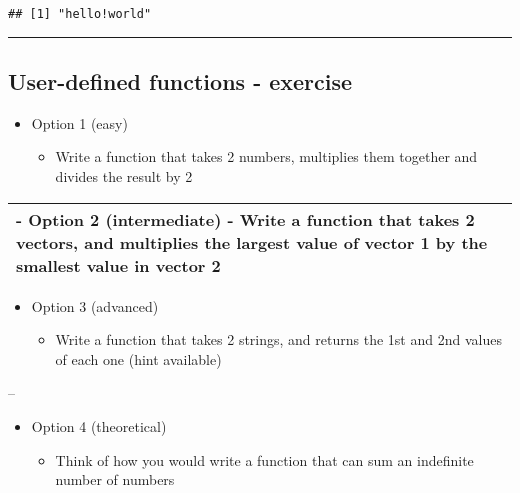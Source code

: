 \documentclass[]{article}
\providecommand{\tightlist}{%
  \setlength{\itemsep}{0pt}\setlength{\parskip}{0pt}}
\begin{document}
\begin{verbatim}
## [1] "hello!world"
\end{verbatim}

\begin{center}\rule{0.5\linewidth}{\linethickness}\end{center}

\hypertarget{user-defined-functions---exercise}{%
\subsection{User-defined functions -
exercise}\label{user-defined-functions---exercise}}

\begin{itemize}
\tightlist
\item
  Option 1 (easy)

  \begin{itemize}
  \tightlist
  \item
    Write a function that takes 2 numbers, multiplies them together and
    divides the result by 2
  \end{itemize}
\end{itemize}

\begin{longtable}[]{@{}l@{}}
\toprule
\endhead
\begin{minipage}[t]{0.04\columnwidth}\raggedright
- Option 2 (intermediate) - Write a function that takes 2 vectors, and
multiplies the largest value of vector 1 by the smallest value in vector
2\strut
\end{minipage}\tabularnewline
\bottomrule
\end{longtable}

\begin{itemize}
\tightlist
\item
  Option 3 (advanced)

  \begin{itemize}
  \tightlist
  \item
    Write a function that takes 2 strings, and returns the 1st and 2nd
    values of each one (hint available)
  \end{itemize}
\end{itemize}

--

\begin{itemize}
\tightlist
\item
  Option 4 (theoretical)

  \begin{itemize}
  \tightlist
  \item
    Think of how you would write a function that can sum an indefinite
    number of numbers
  \end{itemize}
\end{itemize}
\end{document}

